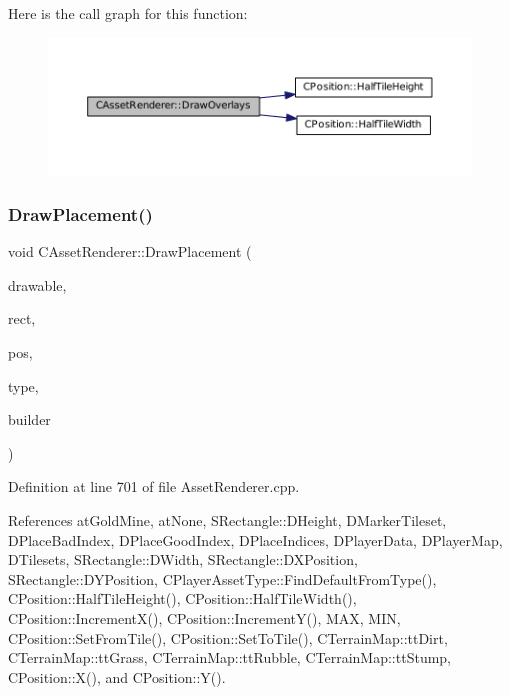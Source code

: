 Here is the call graph for this function\+:\nopagebreak
\begin{figure}[H]
\begin{center}
\leavevmode
\includegraphics[width=350pt]{classCAssetRenderer_a1d2941f9b7aa116f578642c62410bb4a_cgraph}
\end{center}
\end{figure}
\hypertarget{classCAssetRenderer_af9cdf65db6c87c8cfd94fc4a84066b3e}{}\label{classCAssetRenderer_af9cdf65db6c87c8cfd94fc4a84066b3e} 
\subsubsection{\texorpdfstring{Draw\+Placement()}{DrawPlacement()}}
{\footnotesize\ttfamily void C\+Asset\+Renderer\+::\+Draw\+Placement (\begin{DoxyParamCaption}\item[{Gdk\+Drawable $\ast$}]{drawable,  }\item[{const \hyperlink{structSRectangle}{S\+Rectangle} \&}]{rect,  }\item[{const \hyperlink{classCPosition}{C\+Position} \&}]{pos,  }\item[{\hyperlink{GameDataTypes_8h_a5600d4fc433b83300308921974477fec}{E\+Asset\+Type}}]{type,  }\item[{std\+::shared\+\_\+ptr$<$ \hyperlink{classCPlayerAsset}{C\+Player\+Asset} $>$}]{builder }\end{DoxyParamCaption})}



Definition at line 701 of file Asset\+Renderer.\+cpp.



References at\+Gold\+Mine, at\+None, S\+Rectangle\+::\+D\+Height, D\+Marker\+Tileset, D\+Place\+Bad\+Index, D\+Place\+Good\+Index, D\+Place\+Indices, D\+Player\+Data, D\+Player\+Map, D\+Tilesets, S\+Rectangle\+::\+D\+Width, S\+Rectangle\+::\+D\+X\+Position, S\+Rectangle\+::\+D\+Y\+Position, C\+Player\+Asset\+Type\+::\+Find\+Default\+From\+Type(), C\+Position\+::\+Half\+Tile\+Height(), C\+Position\+::\+Half\+Tile\+Width(), C\+Position\+::\+Increment\+X(), C\+Position\+::\+Increment\+Y(), M\+AX, M\+IN, C\+Position\+::\+Set\+From\+Tile(), C\+Position\+::\+Set\+To\+Tile(), C\+Terrain\+Map\+::tt\+Dirt, C\+Terrain\+Map\+::tt\+Grass, C\+Terrain\+Map\+::tt\+Rubble, C\+Terrain\+Map\+::tt\+Stump, C\+Position\+::\+X(), and C\+Position\+::\+Y().


